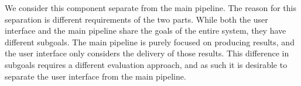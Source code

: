 We consider this component separate from the main pipeline. The reason for this separation is different requirements of the two parts. While both the user interface and the main pipeline share the goals of the entire system, they have different subgoals. The main pipeline is purely focused on producing results, and the user interface only considers the delivery of those results. This difference in subgoals requires a different evaluation approach, and as such it is desirable to separate the user interface from the main pipeline.










